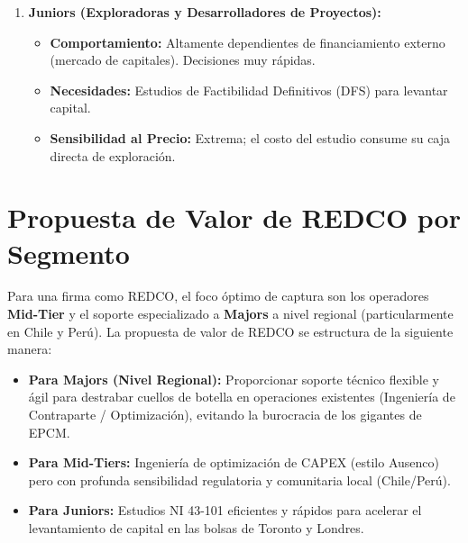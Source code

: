 \begin{enumerate}
    \item \textbf{Juniors (Exploradoras y Desarrolladores de Proyectos):}
    \begin{itemize}
        \item \textbf{Comportamiento:} Altamente dependientes de financiamiento externo (mercado de capitales). Decisiones muy rápidas.
        \item \textbf{Necesidades:} Estudios de Factibilidad Definitivos (DFS) para levantar capital.
        \item \textbf{Sensibilidad al Precio:} Extrema; el costo del estudio consume su caja directa de exploración.
    \end{itemize}
\end{enumerate}

\section{Propuesta de Valor de REDCO por Segmento}
Para una firma como REDCO, el foco óptimo de captura son los operadores \textbf{Mid-Tier} y el soporte especializado a \textbf{Majors} a nivel regional (particularmente en Chile y Perú). La propuesta de valor de REDCO se estructura de la siguiente manera:

\begin{marketdatabox}
\begin{itemize}[leftmargin=*]
    \item \textbf{Para Majors (Nivel Regional):} Proporcionar soporte técnico flexible y ágil para destrabar cuellos de botella en operaciones existentes (Ingeniería de Contraparte / Optimización), evitando la burocracia de los gigantes de EPCM.
    \item \textbf{Para Mid-Tiers:} Ingeniería de optimización de CAPEX (estilo Ausenco) pero con profunda sensibilidad regulatoria y comunitaria local (Chile/Perú).
    \item \textbf{Para Juniors:} Estudios NI 43-101 eficientes y rápidos para acelerar el levantamiento de capital en las bolsas de Toronto y Londres.
\end{itemize}
\end{marketdatabox}
